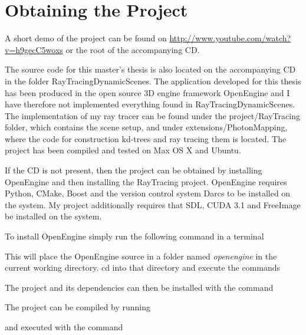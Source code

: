 \chapter{Obtaining the Project}

A short demo of the project can be found on
\url{http://www.youtube.com/watch?v=h9gecC5woxs} or the root of the accompanying
CD.

The source code for this master's thesis is also located on the accompanying CD
in the folder RayTracingDynamicScenes. The application developed for this thesis
has been produced in the open source 3D engine framework OpenEngine and I have
therefore not implemented everything found in RayTracingDynamicScenes. The
implementation of my ray tracer can be found under the project/RayTracing
folder, which contains the scene setup, and under extensions/PhotonMapping,
where the code for construction kd-trees and ray tracing them is located. The
project has been compiled and tested on Max OS X and Ubuntu.

If the CD is not present, then the project can be obtained by installing
OpenEngine and then installing the RayTracing project. OpenEngine requires
Python, CMake, Boost and the version control system Darcs to be installed on the
system. My project additionally requires that SDL, CUDA 3.1 and FreeImage be
installed on the system.

To install OpenEngine simply run the following command in a terminal


This will place the OpenEngine source in a folder named \textit{openengine} in
the current working directory. cd into that directory and execute the commands



The project and its dependencies can then be installed with the command


The project can be compiled by running


and executed with the command

